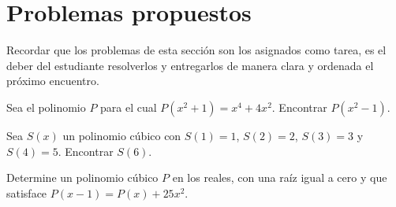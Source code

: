 \section{Problemas propuestos}
{
    Recordar que los problemas de esta sección son los asignados como tarea, es el deber del estudiante resolverlos y entregarlos
    de manera clara y ordenada el próximo encuentro.

    \begin{section-problem}
        Sea el polinomio $P$ para el cual $P(x^2 + 1) = x^4 + 4x^2$.
        Encontrar $P(x^2 - 1).$
    \end{section-problem}

    \begin{section-problem}
        Sea $S(x)$ un polinomio cúbico con $S(1) = 1$, $S(2) = 2$, $S(3) = 3$ y $S(4) = 5$.
        Encontrar $S(6)$.
    \end{section-problem}

    \begin{section-problem}
        Determine un polinomio cúbico $P$ en los reales, con una raíz igual a cero y que satisface $P(x - 1) = P(x) + 25x^2$.
    \end{section-problem}

}\label{sec:problemas-propuestos}
